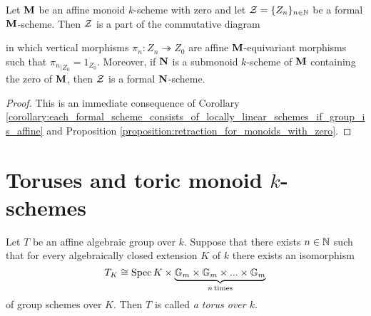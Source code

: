 \begin{corollary}\label{corollary:restraction_for_formal_schemes_and_pointed_submonoids}
Let $\mathbf{M}$ be an affine monoid $k$-scheme with zero and let ${\mathcal Z} = \{Z_n\}_{n\in {\mathbb N}}$ be a formal $\mathbf{M}$-scheme. Then ${\mathcal Z}$ is a part of the commutative diagram
\begin{center}
\end{center}
in which vertical morphisms $\pi_n:Z_n\twoheadrightarrow Z_0$ are affine $\mathbf{M}$-equivariant morphisms such that ${\pi_n}_{\mid Z_0} = 1_{Z_0}$. Moreover, if $\mathbf{N}$ is a submonoid $k$-scheme of $\mathbf{M}$ containing the zero of $\mathbf{M}$, then ${\mathcal Z}$ is a formal $\mathbf{N}$-scheme.
\end{corollary}
\begin{proof}
This is an immediate consequence of Corollary \ref{corollary:each_formal_scheme_consists_of_locally_linear_schemes_if_group_is_affine} and Proposition \ref{proposition:retraction_for_monoids_with_zero}.
\end{proof}

\section{Toruses and toric monoid $k$-schemes}

\begin{definition}
Let $T$ be an affine algebraic group over $k$. Suppose that there exists $n\in {\mathbb N}$ such that for every algebraically closed extension $K$ of $k$ there exists an isomorphism
$$T_K \cong  \mathrm{Spec}\, K \times \underbrace{\mathbb{G}_{m}\times \mathbb{G}_{m}\times ...\times \mathbb{G}_{m}}_{n\,\mathrm{times}} $$
of group schemes over $K$. Then $T$ is called \textit{a torus over $k$}.
\end{definition}

